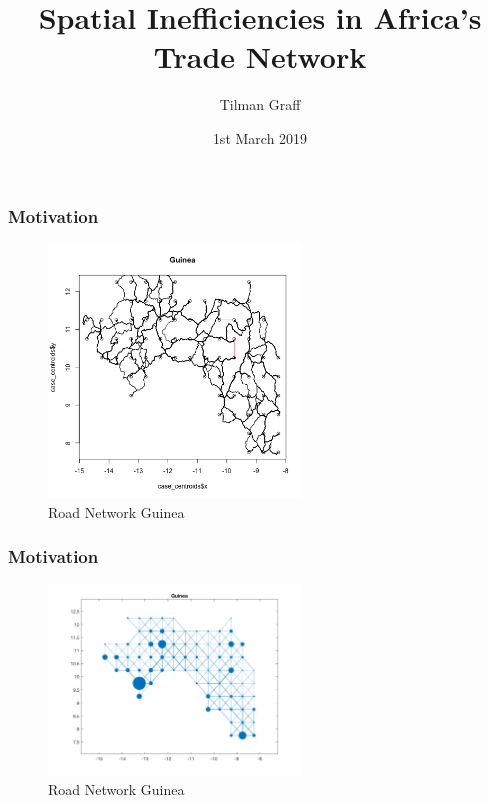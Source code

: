 \documentclass[]{beamer}   	%
\title{Spatial Inefficiencies in Africa's Trade Network}
\author{Tilman Graff}
\institute{Busara Center for Behavioral Economics \\ \& Princeton University}
\date{1st March 2019}
\begin{document}
\begin{frame}
  \titlepage
\end{frame}

\begin{frame}
  \frametitle{Motivation}
  \begin{figure}
    \includegraphics[width=0.6\textwidth, trim={1cm 1cm 0cm 2cm},clip]{../../Build/output/Road_Networks/network_Guinea.png}
    \caption{Road Network Guinea}

  \end{figure}
\end{frame}

\begin{frame}
  \frametitle{Motivation}
\begin{figure}
    \includegraphics[width=0.6\textwidth, trim={2cm 1cm 1.5cm 0cm},clip]{../../Build/output/Matlab_graphs/Nicer_graphs/Guinea_stat.png}
    \caption{Road Network Guinea}

  \end{figure}
\end{frame}
\end{document}

